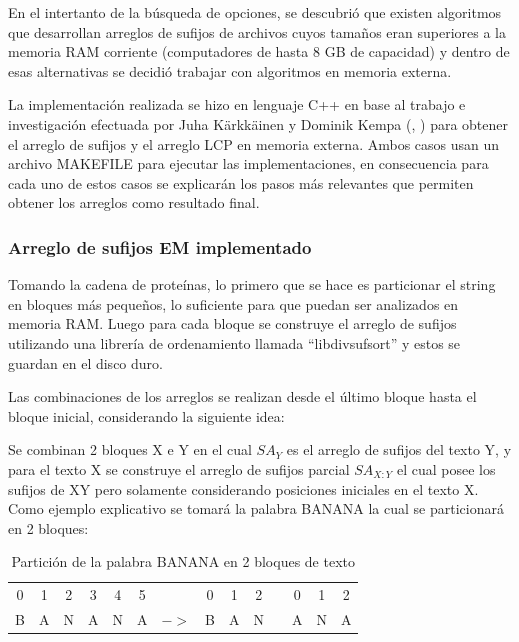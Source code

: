 En el intertanto de la búsqueda de opciones, se descubrió que existen algoritmos que desarrollan arreglos de sufijos de archivos cuyos tamaños eran superiores a la memoria RAM corriente (computadores de hasta 8 GB de capacidad) y dentro de esas alternativas se decidió trabajar con algoritmos en memoria externa.

La implementación realizada se hizo en lenguaje C++ en base al trabajo e investigación efectuada por Juha Kärkkäinen y Dominik Kempa (\cite{sascan}, \cite{emsparse}) para obtener el arreglo de sufijos y el arreglo LCP en memoria externa. Ambos casos usan un archivo MAKEFILE para ejecutar las implementaciones, en consecuencia para cada uno de estos casos se explicarán los pasos más relevantes que permiten obtener los arreglos como resultado final.

\subsubsection{Arreglo de sufijos EM implementado}

Tomando la cadena de proteínas, lo primero que se hace es particionar el string en bloques más pequeños, lo suficiente para que puedan ser analizados en memoria RAM. Luego para cada bloque se construye el arreglo de sufijos utilizando una librería de ordenamiento llamada ``libdivsufsort'' \cite{yutamori} y estos se guardan en el disco duro.

Las combinaciones de los arreglos se realizan desde el último bloque hasta el bloque inicial, considerando la siguiente idea:

Se combinan 2 bloques X e Y en el cual $SA_{Y}$ es el arreglo de sufijos del texto Y, y para el texto X se construye el arreglo de sufijos parcial $SA_{X:Y}$ el cual posee los sufijos de XY pero solamente considerando posiciones iniciales en el texto X. Como ejemplo explicativo se tomará la palabra BANANA la cual se particionará en 2 bloques:

\begin{table}[h]
\centering
\begin{tabular}{cccccccccccccc}
0                       & 1                      & 2                      & 3                      & 4                      & 5                      &                                    & 0                      & 1                      & 2                      &                       & 0                      & 1                      & 2                      \\ \cline{1-6} \cline{8-10} \cline{12-14} 
\multicolumn{1}{|c|}{B} & \multicolumn{1}{c|}{A} & \multicolumn{1}{c|}{N} & \multicolumn{1}{c|}{A} & \multicolumn{1}{c|}{N} & \multicolumn{1}{c|}{A} & \multicolumn{1}{c|}{$->$} & \multicolumn{1}{c|}{B} & \multicolumn{1}{c|}{A} & \multicolumn{1}{c|}{N} & \multicolumn{1}{c|}{} & \multicolumn{1}{c|}{A} & \multicolumn{1}{c|}{N} & \multicolumn{1}{c|}{A} \\ \cline{1-6} \cline{8-10} \cline{12-14} 
\end{tabular}
\caption{Partición de la palabra BANANA en 2 bloques de texto}
\end{table}

